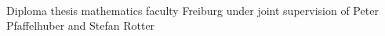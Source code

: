 \begin{titlepage}
	\begin{addmargin}[-1cm]{-3cm}
    \begin{center}
        \large  

        \hfill

        \vfill

        \begingroup
           \spacedallcaps{\myTitle} \\ \bigskip
        \endgroup

        \spacedlowsmallcaps{\myName}

        \vfill


        Diploma thesis mathematics faculty Freiburg under joint
        supervision of Peter Pfaffelhuber and Stefan Rotter \\
        \medskip
        \myUni \\ \bigskip

        \myTime\ 

        \vfill                      

    \end{center}  
  \end{addmargin}       
\end{titlepage}   

